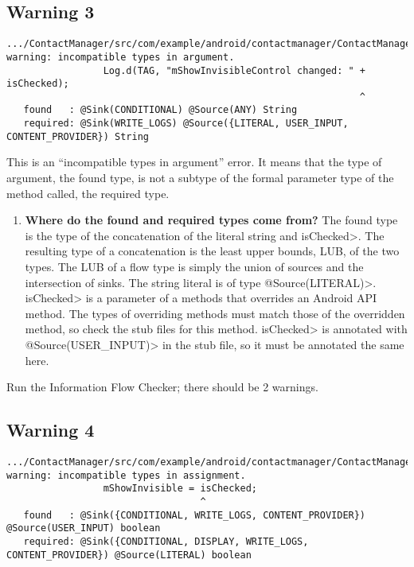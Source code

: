   \subsection{Warning 3 }
   \begin{Verbatim}
.../ContactManager/src/com/example/android/contactmanager/ContactManager.java:74: 
warning: incompatible types in argument.
                 Log.d(TAG, "mShowInvisibleControl changed: " + isChecked);
                                                              ^
   found   : @Sink(CONDITIONAL) @Source(ANY) String
   required: @Sink(WRITE_LOGS) @Source({LITERAL, USER_INPUT, CONTENT_PROVIDER}) String
\end{Verbatim} 
This is an ``incompatible types in argument'' error.  It means that the type
of argument, the found type, is not a subtype of the formal 
parameter type of the method called, the required type.
 \begin{enumerate}

\item\textbf{Where do the found and required types come from?}
The found type is the type of the concatenation of the literal string and \<isChecked>.  The
resulting type of a concatenation is the least upper bounds, LUB, of the two types.   The LUB
of a flow type is simply 
 the union of sources and the intersection of sinks.  The string literal is of type 
\<@Source(LITERAL)>.  \<isChecked> is a parameter of a methods that overrides an
Android API method.  The types of overriding methods must match those of the overridden
method, so check the stub files for this method.  \<isChecked> is annotated with 
\<@Source(USER\_INPUT)>  in the stub file, so it must be annotated the same here.\newline

 \end{enumerate}

Run the Information Flow Checker; there should be 2 warnings.
  
  \subsection{Warning 4 }
   \begin{Verbatim}
.../ContactManager/src/com/example/android/contactmanager/ContactManager.java:77: 
warning: incompatible types in assignment.
                 mShowInvisible = isChecked;
                                  ^
   found   : @Sink({CONDITIONAL, WRITE_LOGS, CONTENT_PROVIDER}) @Source(USER_INPUT) boolean
   required: @Sink({CONDITIONAL, DISPLAY, WRITE_LOGS, CONTENT_PROVIDER}) @Source(LITERAL) boolean
    \end{Verbatim} 

